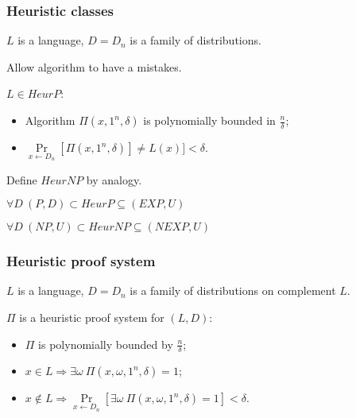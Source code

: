 \begin{frame}
    \frametitle{Heuristic classes}

    $L$ is a language, $D = {D_n}$ is a family of distributions.

    Allow algorithm to have a mistakes.

    \pause
    \begin{definition}
        $L \in HeurP$:
        \begin{itemize}
            \item Algorithm $\Pi(x, 1^n, \delta)$ is polynomially bounded in $\frac{n}{\delta}$;
            \item $\Pr\limits_{x \gets D_n}[\Pi(x, 1^n, \delta)] \neq
        		L(x)] < \delta$.
        \end{itemize}
    \end{definition}

    Define $HeurNP$ by analogy.

    \pause

    \vspace{0.5cm}
    $\forall D~ (P, D) \subset HeurP \subseteq (EXP, U)$
    
    $\forall D~ (NP, U) \subset HeurNP \subseteq (NEXP, U)$
\end{frame}

\begin{frame}
    \frametitle{Heuristic proof system}

    $L$ is a language, $D = {D_n}$ is a family of distributions on
    complement $L$.

    \pause
    \begin{definition}
        $\Pi$ is a heuristic proof system for $(L, D)$:
        \begin{itemize}
            \item $\Pi$ is polynomially bounded by $\frac{n}{\delta}$;
            \item $x \in L \Rightarrow \exists \omega~\Pi(x, \omega,
        		1^n, \delta) = 1$;
            \item $x \notin L \Rightarrow
        		\Pr\limits_{x \gets D_n}[\exists \omega~
                \Pi(x, \omega, 1^n, \delta) = 1] < \delta$.
        \end{itemize}
    \end{definition}
    
\end{frame}

